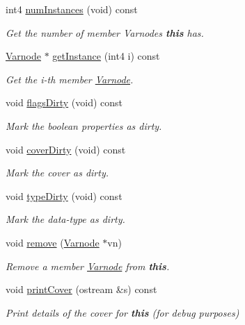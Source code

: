 \begin{DoxyCompactItemize}
int4 \mbox{\hyperlink{class_high_variable_a111ec7b8c313b6b89e7fb45f9025e524}{num\+Instances}} (void) const
\begin{DoxyCompactList}\small\item\em Get the number of member Varnodes {\bfseries{this}} has. \end{DoxyCompactList}\item 
\mbox{\hyperlink{class_varnode}{Varnode}} $\ast$ \mbox{\hyperlink{class_high_variable_a68574ef0c95bc66f499dd88844e5f728}{get\+Instance}} (int4 i) const
\begin{DoxyCompactList}\small\item\em Get the i-\/th member \mbox{\hyperlink{class_varnode}{Varnode}}. \end{DoxyCompactList}\item 
void \mbox{\hyperlink{class_high_variable_a33d4e9529cead1b1cad9377e08eac03c}{flags\+Dirty}} (void) const
\begin{DoxyCompactList}\small\item\em Mark the boolean properties as {\itshape dirty}. \end{DoxyCompactList}\item 
void \mbox{\hyperlink{class_high_variable_abfccefe09b47f44250284e3fae328cb5}{cover\+Dirty}} (void) const
\begin{DoxyCompactList}\small\item\em Mark the cover as {\itshape dirty}. \end{DoxyCompactList}\item 
void \mbox{\hyperlink{class_high_variable_ae46ff10cd5a8c8d35837784d6938ac2b}{type\+Dirty}} (void) const
\begin{DoxyCompactList}\small\item\em Mark the data-\/type as {\itshape dirty}. \end{DoxyCompactList}\item 
void \mbox{\hyperlink{class_high_variable_a707f342c2072c5b7f52d24e64751d31a}{remove}} (\mbox{\hyperlink{class_varnode}{Varnode}} $\ast$vn)
\begin{DoxyCompactList}\small\item\em Remove a member \mbox{\hyperlink{class_varnode}{Varnode}} from {\bfseries{this}}. \end{DoxyCompactList}\item 
void \mbox{\hyperlink{class_high_variable_ad550ad1465e95cb3b114ee9d6f4d5630}{print\+Cover}} (ostream \&s) const
\begin{DoxyCompactList}\small\item\em Print details of the cover for {\bfseries{this}} (for debug purposes) \end{DoxyCompactList}\item 

\end{DoxyCompactItemize}
